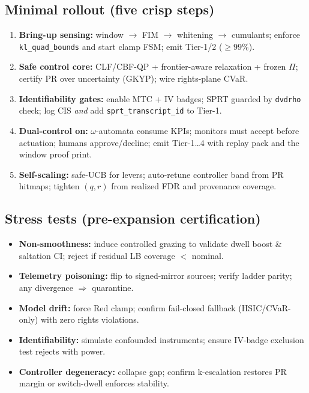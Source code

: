 \subsection*{Minimal rollout (five crisp steps)}\label{subsec:ops-rollout}
\emph{}
\begin{enumerate}[leftmargin=*]
\item \textbf{Bring-up sensing:} window $\to$ FIM $\to$ whitening $\to$ cumulants; enforce \texttt{kl\_quad\_bounds} and start clamp FSM; emit Tier-1/2 ($\ge99\%$).
\item \textbf{Safe control core:} CLF/CBF-QP + frontier-aware relaxation + frozen $\Pi$; certify PR over uncertainty (GKYP); wire rights-plane CVaR.
\item \textbf{Identifiability gates:} enable MTC + IV badges; SPRT guarded by \texttt{dvdrho} check; log CIS \emph{and} add \texttt{sprt\_transcript\_id} to Tier-1.
\item \textbf{Dual-control on:} $\omega$-automata consume KPIs; monitors must accept before actuation; humans approve/decline; emit Tier-1…4 with replay pack and the window proof print.
\item \textbf{Self-scaling:} safe-UCB for levers; auto-retune controller band from PR hitmaps; tighten $(q,r)$ from realized FDR and provenance coverage.
\end{enumerate}

\subsection*{Stress tests (pre-expansion certification)}\label{subsec:ops-stress}
\emph{}
\begin{itemize}[leftmargin=*]
\item \textbf{Non-smoothness:} induce controlled grazing to validate dwell boost \& saltation CI; reject if residual LB coverage $<$ nominal.
\item \textbf{Telemetry poisoning:} flip to signed-mirror sources; verify ladder parity; any divergence $\Rightarrow$ quarantine.
\item \textbf{Model drift:} force Red clamp; confirm fail-closed fallback (HSIC/CVaR-only) with zero rights violations.
\item \textbf{Identifiability:} simulate confounded instruments; ensure IV-badge exclusion test rejects with power.
\item \textbf{Controller degeneracy:} collapse gap; confirm k-escalation restores PR margin or switch-dwell enforces stability.
\end{itemize}


